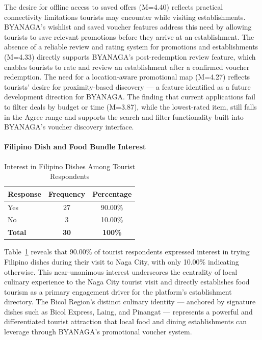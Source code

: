 \documentclass{research}
\begin{document}
The desire for offline access to saved offers (M=4.40) reflects practical 
connectivity limitations tourists may encounter while visiting establishments. 
BYANAGA's wishlist and saved voucher features address this need by allowing 
tourists to save relevant promotions before they arrive at an establishment. The 
absence of a reliable review and rating system for promotions and establishments 
(M=4.33) directly supports BYANAGA's post-redemption review feature, which 
enables tourists to rate and review an establishment after a confirmed voucher 
redemption. The need for a location-aware promotional map (M=4.27) reflects 
tourists' desire for proximity-based discovery --- a feature identified as a 
future development direction for BYANAGA. The finding that current applications 
fail to filter deals by budget or time (M=3.87), while the lowest-rated item, 
still falls in the Agree range and supports the search and filter functionality 
built into BYANAGA's voucher discovery interface.

\paragraph{Filipino Dish and Food Bundle Interest}

\begin{table}[h]
    \centering
    \begin{tabular}{|l|c|c|}
        \hline
        \textbf{Response} & \textbf{Frequency} & \textbf{Percentage} \\
        \hline
        Yes & 27 & 90.00\% \\
        No  & 3  & 10.00\% \\
        \hline
        \textbf{Total} & \textbf{30} & \textbf{100\%} \\
        \hline
    \end{tabular}
    \caption{Interest in Filipino Dishes Among Tourist Respondents}
    \label{tab:filipino_dish_tourist}
\end{table}

Table~\ref{tab:filipino_dish_tourist} reveals that 90.00\% of tourist respondents 
expressed interest in trying Filipino dishes during their visit to Naga City, 
with only 10.00\% indicating otherwise. This near-unanimous interest underscores 
the centrality of local culinary experience to the Naga City tourist visit and 
directly establishes food tourism as a primary engagement driver for the 
platform's establishment directory. The Bicol Region's distinct culinary 
identity --- anchored by signature dishes such as Bicol Express, Laing, and 
Pinangat --- represents a powerful and differentiated tourist attraction that 
local food and dining establishments can leverage through BYANAGA's promotional 
voucher system.
\end{document}
